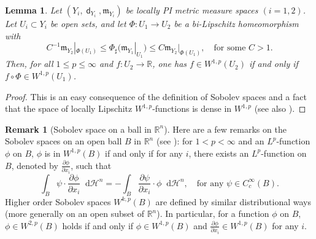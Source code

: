 \documentclass[11pt,reqno]{amsart}
\newtheorem{lemma}[theorem]{Lemma}
\theoremstyle{definition}
\newtheorem{remark}[theorem]{Remark}
\numberwithin{equation}{section}
\newcommand{\di}{\mathop{}\!\mathrm{d}}
\newcommand{\meas}{\mathfrak{m}}
\DeclareMathOperator{\dist}{\mathsf{d}}
\newcommand{\haus}{\mathscr{H}}
\begin{document}
\begin{lemma}\label{sobolevcomp}
Let $(Y_i, \dist_{Y_i}, \meas_{Y_i})$  be locally PI metric measure spaces $(i=1,2)$. Let $U_i \subset Y_i$ be open sets, and let $\Phi:U_1 \to U_2$ be a bi-Lipschitz homeomorphism with 
$$C^{-1}\meas_{Y_2}|_{\Phi(U_1)} \le \Phi_{\sharp}(\meas_{Y_1}|_{U_1}) \le C\meas_{Y_2}|_{\Phi(U_1)}, \quad \text{for some $C>1$}.$$
 Then, for all $1\le p\le \infty$ and  $f:U_2 \to \mathbb{R}$, one has $f \in W^{1,p}(U_2)$   if and only if $f \circ \Phi \in W^{1,p}(U_1)$. 
\end{lemma}
\begin{proof}
This is an easy consequence of the definition of Sobolev spaces and a fact that the space of locally Lipschitz $W^{1,p}$-functions is dense in $W^{1,p}$ (see also \cite{BjornBjorn, HKPST}). 
\end{proof}

\begin{remark}[Sobolev space on a ball in $\mathbb{R}^n$]\label{compsob}
    Here are a few remarks on the Sobolev spaces on an open ball  $B$ in $\mathbb{R}^n$ (see \cite{GT}):
    for $1<p<\infty$ and an $L^p$-function $\phi$ on $B$, $\phi$ is in $W^{1,p}(B)$ if and only if for any $i$, there exists an $L^p$-function on $B$, denoted by $\frac{\partial \phi}{\partial x_i}$, such that 
\begin{equation}\label{integpart}
\int_B\psi \cdot \frac{\partial \phi}{\partial x_i}\di \haus^n=-\int_B\frac{\partial \psi}{\partial x_i}\cdot \phi \di \haus^n,\quad \text{for any $\psi \in C_c^{\infty}(B)$.}
\end{equation}
Higher order Sobolev spaces $W^{k, p}(B)$ are defined by similar distributional ways (more generally on an open subset of $\mathbb{R}^n$).
In particular, for a function $\phi$ on $B$, $\phi \in W^{2,p}(B)$ holds if and only if $\phi \in W^{1, p}(B)$ and $\frac{\partial \phi}{\partial x_i} \in W^{1,p}(B)$ for any $i$. 
\end{remark}
\end{document}
